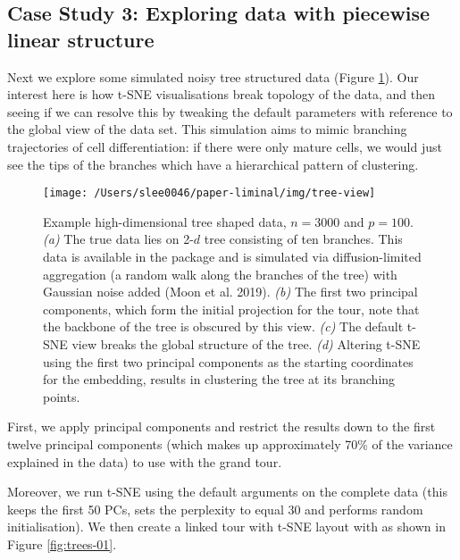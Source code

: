 \documentclass[article,notitle]{jdssv}
\begin{document}
\hypertarget{case-study-3-exploring-data-with-piecewise-linear-structure}{%
\subsection{Case Study 3: Exploring data with piecewise linear structure}\label{case-study-3-exploring-data-with-piecewise-linear-structure}}

Next we explore some simulated noisy tree structured data (Figure
\ref{fig:fake-trees}). Our interest here is how t-SNE visualisations break
topology of the data, and then seeing if we can resolve this by tweaking the
default parameters with reference to the global view of the data set.
This simulation aims to mimic branching trajectories of cell differentiation:
if there were only mature cells, we would just see the tips of the branches
which have a hierarchical pattern of clustering.



\begin{figure}

{\centering \texttt{[image: /Users/slee0046/paper-liminal/img/tree-view]} 

}

\caption{Example high-dimensional tree shaped data, \(n = 3000\) and \(p = 100\). \emph{(a)} The true data lies on 2-\(d\) tree consisting of ten branches. This data is available in the  package and is simulated via diffusion-limited aggregation (a random walk along the branches of the tree) with Gaussian noise added (Moon et al. 2019). \emph{(b)} The first two principal components, which form the initial projection for the tour, note that the backbone of the tree is obscured by this view. \emph{(c)} The default t-SNE view breaks the global structure of the tree. \emph{(d)} Altering t-SNE using the first two principal components as the starting coordinates for the embedding, results in clustering the tree at its branching points.}\label{fig:fake-trees}
\end{figure}

First, we apply principal components and restrict the results down to the first
twelve principal components (which makes up approximately 70\% of the variance
explained in the data) to use with the grand tour.

Moreover, we run t-SNE using the default arguments on the complete data (this
keeps the first 50 PCs, sets the perplexity to equal 30 and performs random
initialisation). We then create a linked
tour with t-SNE layout with  as shown in Figure \ref{fig:trees-01}.
\end{document}
